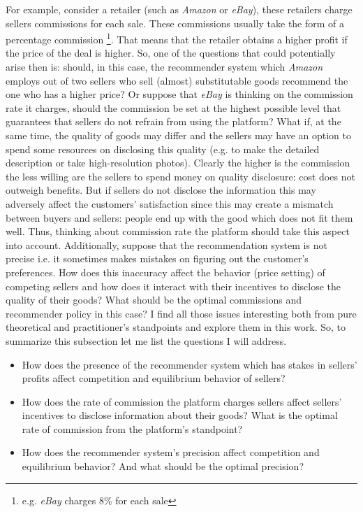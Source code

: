 \documentclass[a4paper]{article}
\begin{document}
For example, consider a retailer (such as \textit{Amazon} or \textit{eBay}), these retailers charge sellers commissions for each sale. These commissions usually take the form of a percentage commission \footnote{e.g. \textit{eBay} charges 8\% for each sale}. That means that the retailer obtains a higher profit if the price of the deal is higher. So, one of the questions that could potentially arise then is: should, in this case, the recommender system which \textit{Amazon} employs out of two sellers who sell (almost) substitutable goods recommend the one who has a higher price? Or suppose that \textit{eBay} is thinking on the commission rate it charges, %
 should the commission be set at the highest possible level that guarantees that sellers do not refrain from using the platform? What if, at the same time, the quality of goods may differ and the sellers may have an option to spend some resources on disclosing this quality (e.g. to make the detailed description or take high-resolution photos). Clearly the higher is the commission the less willing are the sellers to spend money on quality disclosure: cost does not outweigh benefits. But if sellers do not disclose the information this may adversely affect the customers' satisfaction since this may create a mismatch between buyers and sellers: people end up with the good which does not fit them well. Thus, thinking about commission rate the platform should take this aspect into account. Additionally, suppose that the recommendation system is not precise i.e. it sometimes makes mistakes on figuring out the customer's preferences. How does this inaccuracy affect the behavior (price setting) of competing sellers and how does it interact with their incentives to disclose the quality of their goods? What should be the optimal commissions and recommender policy in this case? I find all those issues interesting both from pure theoretical and practitioner's standpoints and explore them in this work.
 So, to summarize this subsection let me list the questions I will address.
 \begin{itemize}
 	\item How does the presence of the recommender system which has stakes in sellers' profits affect competition and equilibrium behavior of sellers?
 	\item How does the rate of commission the platform charges sellers affect sellers' incentives to disclose information about their goods? What is the optimal rate of commission from the platform's standpoint?
 	\item How does the recommender system's precision affect competition and equilibrium behavior? And what should be the optimal precision?
 \end{itemize}
 
\end{document}
